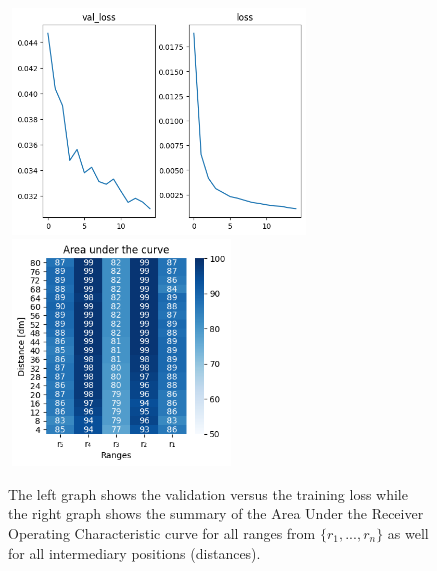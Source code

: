 \begin{multicols}{2}
\begin{itemize}
\end{itemize}
\end{multicols}\begin{figure}[H]%
\centering
\includegraphics[width=8cm,height=6cm]{3_models/models_31/graph_31.png}
\hspace{0.2 cm}
\includegraphics[width=6cm,height=6cm]{4_plots/plots_31/AUC_31.png}
\caption{The left graph shows the validation versus the training loss while the right graph shows the summary of the Area Under the Receiver Operating Characteristic curve for all ranges from $\{r_{1}, ... ,r_{n}\}$ as well for all intermediary positions (distances).}
\label{auc_31}
\end{figure}



\newpage
